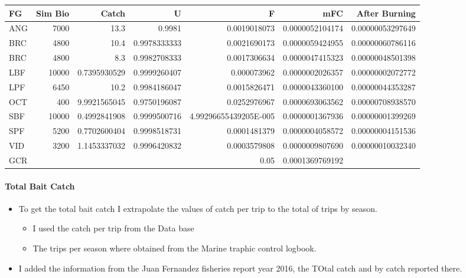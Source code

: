 \documentclass[11pt]{article}
\begin{document}
\begin{center}
\begin{tabular}{lrrrrrr}
 FG   &  Sim Bio  &         Catch  &             U  &                      F  &              mFC  &     After Burning  \\
\hline
 ANG  &     7000  &          13.3  &        0.9981  &           0.0019018073  &  0.0000052104174  &  0.00000053297649  \\
 BRC  &     4800  &          10.4  &  0.9978333333  &           0.0021690173  &  0.0000059424955  &  0.00000060786116  \\
 BRC  &     4800  &           8.3  &  0.9982708333  &           0.0017306634  &  0.0000047415323  &  0.00000048501398  \\
 LBF  &    10000  &  0.7395930529  &  0.9999260407  &            0.000073962  &  0.0000002026357  &  0.00000002072772  \\
 LPF  &     6450  &          10.2  &  0.9984186047  &           0.0015826471  &  0.0000043360100  &  0.00000044353287  \\
 OCT  &      400  &  9.9921565045  &  0.9750196087  &           0.0252976967  &  0.0000693063562  &  0.00000708938570  \\
 SBF  &    10000  &  0.4992841908  &  0.9999500716  &  4.99296655439205E-005  &  0.0000001367936  &  0.00000001399269  \\
 SPF  &     5200  &  0.7702600404  &  0.9998518731  &           0.0001481379  &  0.0000004058572  &  0.00000004151536  \\
 VID  &     3200  &  1.1453337032  &  0.9996420832  &           0.0003579808  &  0.0000009807690  &  0.00000010032340  \\
 GCR  &           &                &                &                   0.05  &  0.0001369769192  &                    \\
\end{tabular}
\end{center}
\paragraph*{Total Bait Catch}
\label{sec-5-2-2-7}

\begin{itemize}
\item To get the total bait catch I extrapolate the values of catch per trip to the total of trips by season.
\begin{itemize}
\item I used the catch per trip from the Data base
\item The trips per season where obtained from the Marine traphic control logbook.
\end{itemize}
\item I added the information from the Juan Fernandez fisheries report year 2016, the TOtal catch and by catch reported there.
\end{itemize}
\end{document}
